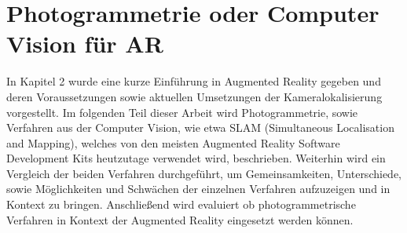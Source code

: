 \section{Photogrammetrie oder Computer Vision für AR}

In Kapitel 2 wurde eine kurze Einführung in Augmented Reality gegeben und deren Voraussetzungen sowie aktuellen Umsetzungen der Kameralokalisierung vorgestellt. Im folgenden Teil dieser Arbeit wird Photogrammetrie, sowie Verfahren aus der Computer Vision, wie etwa SLAM (Simultaneous Localisation and Mapping), welches von den meisten Augmented Reality Software Development Kits heutzutage verwendet wird, beschrieben. Weiterhin wird ein Vergleich der beiden Verfahren durchgeführt, um Gemeinsamkeiten, Unterschiede, sowie Möglichkeiten und Schwächen der einzelnen Verfahren aufzuzeigen und in Kontext zu bringen. Anschließend wird evaluiert ob photogrammetrische Verfahren in Kontext der Augmented Reality eingesetzt werden können.

